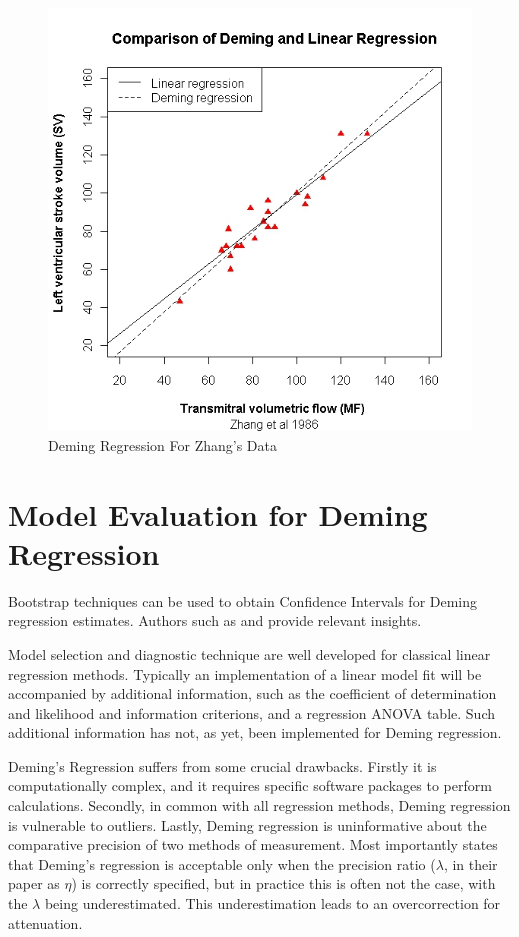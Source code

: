 \documentclass[12pt, a4paper]{report}
\theoremstyle{plain}
\theoremstyle{definition}
\theoremstyle{remark}
\begin{document}
\begin{figure}[h!]
	\includegraphics[width=130mm]{images/ZhangDeming.jpeg}
	\caption{Deming Regression For Zhang's Data}\label{ZhangDeming}
\end{figure}


\section{Model Evaluation for Deming Regression}
Bootstrap techniques can be used to obtain Confidence Intervals for Deming regression estimates. Authors such as 
\citet{carpenter2000bootstrap} and \citet{johnson2001bootstrap} provide relevant insights.




Model selection and diagnostic technique are well developed for classical linear regression methods. Typically an implementation of a linear model fit will be accompanied by additional information, such as the coefficient of determination and likelihood and information criterions, and a regression ANOVA table. Such additional information has not, as yet, been implemented for Deming regression.

Deming's Regression suffers from some crucial drawbacks. Firstly it is computationally complex, and it requires specific software packages to perform calculations. Secondly, in common with all regression methods, Deming regression is vulnerable to outliers. Lastly, Deming regression is uninformative
about the comparative precision of two methods of measurement. Most importantly \citet{CarollRupert} states that Deming's regression is acceptable only when the precision ratio ($\lambda$, in their paper as $\eta$) is correctly specified, but in practice this is often not the case, with the $\lambda$ being underestimated. This underestimation leads to an overcorrection for attenuation.
\end{document}

